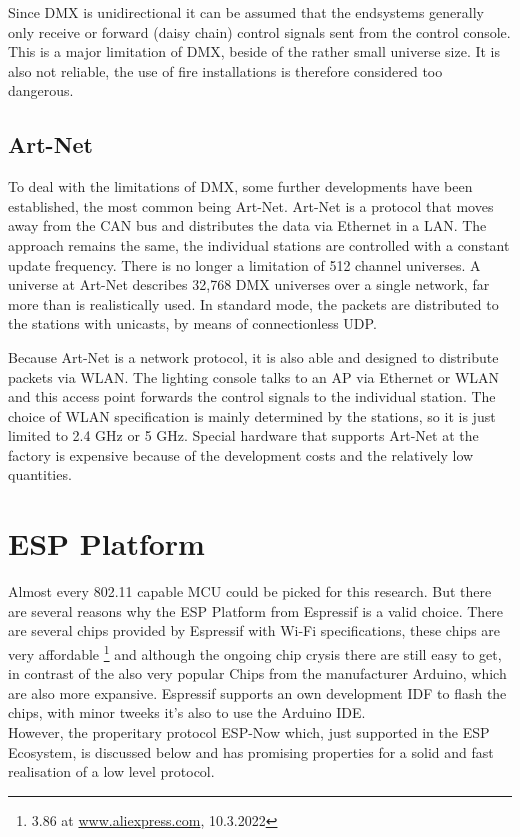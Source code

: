 Since \ac{DMX} is unidirectional it can be assumed that the endsystems generally only receive or forward (daisy chain) control signals sent from the control console.
This is a major limitation of DMX, beside of the rather small universe size.
It is also not reliable, the use of fire installations is therefore considered too dangerous.

\subsection*{Art-Net}
\label{sec:artnet}

To deal with the limitations of DMX, some further developments have been established, the most common being Art-Net.
Art-Net is a protocol that moves away from the CAN bus and distributes the data via Ethernet in a \ac{LAN}.
The approach remains the same, the individual stations are controlled with a constant update frequency.
There is no longer a limitation of 512 channel universes.
A universe at Art-Net describes 32,768 DMX universes over a single network, far more than is realistically used.
In standard mode, the packets are distributed to the stations with unicasts, by means of connectionless \ac{UDP}.

Because Art-Net is a network protocol, it is also able and designed to distribute packets via WLAN.
The lighting console talks to an \ac{AP} via Ethernet or WLAN 
and this access point forwards the control signals to the individual station.
The choice of WLAN specification is mainly determined by the stations,
so it is just limited to 2.4 GHz or 5 GHz.
Special hardware that supports Art-Net at the factory is expensive
because of the development costs and the relatively low quantities.

\section{ESP Platform}

Almost every 802.11 capable \ac{MCU} could be picked for this research.
But there are several reasons why the ESP Platform from Espressif is a valid choice.
There are several chips provided by Espressif with Wi-Fi specifications, these chips are very affordable
\footnote{3.86 at \url{www.aliexpress.com}, 10.3.2022}
and although the ongoing chip crysis there are still easy to get, in contrast of the also very popular Chips from the manufacturer Arduino, which are also more expansive.
Espressif supports an own development IDF to flash the chips, with minor tweeks it's also to use the Arduino IDE.\\
However, the properitary protocol ESP-Now which, just supported in the ESP Ecosystem, is discussed below
and has promising properties for a solid and fast realisation of a low level protocol.


